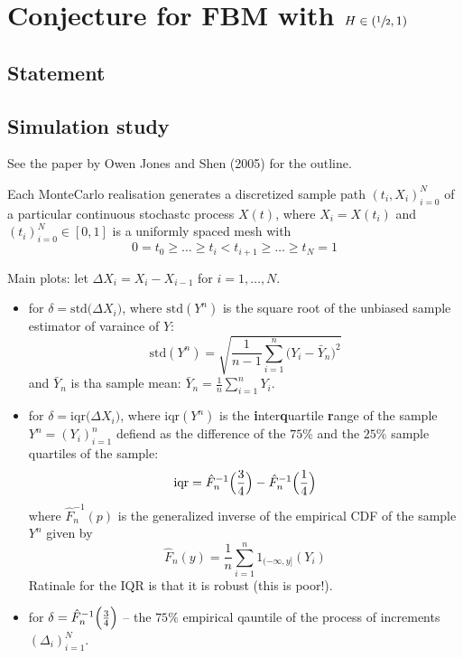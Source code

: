 \documentclass[a4paper]{report}
\begin{document}


\section{Conjecture for FBM with $H\in (\sfrac{1}{2},1)$} %
\label{sec:conjecture_for_fbm}

\subsection{Statement} %
\label{sub:statement}


\subsection{Simulation study} %
\label{sub:simulation_study_fbm}

See the paper by Owen Jones and Shen (2005) for the outline.

Each MonteCarlo realisation generates a discretized sample path $(t_i, X_i)_{i=0}^N$ of
a particular continuous stochastc process $X(t)$, where $X_i = X(t_i)$ and $(t_i)_{i=0}^N\in [0,1]$
is a uniformly spaced mesh with
\[0 = t_0 \geq \ldots \geq t_i < t_{i+1} \geq \ldots \geq t_N = 1\]

Main plots: let $\Delta X_i = X_i - X_{i-1}$ for $i=1,\ldots, N$.
\begin{itemize}
	\item for $\delta = \text{std}\bigl(\Delta X_i \bigr)$, where $\text{std}(Y^n)$ is
	the square root of the unbiased sample estimator of varaince of $Y$:
	\[ \text{std}(Y^n) = \sqrt{ \frac{1}{n-1} \sum_{i=1}^n \bigl( Y_i - \bar{Y}_n \bigr)^2 }\]
	and $\bar{Y}_n$ is tha sample mean: $\bar{Y}_n = \frac{1}{n}\sum_{i=1}^n Y_i$. 

	\item for $\delta = \text{iqr}\bigl(\Delta X_i \bigr)$, where $\text{iqr}(Y^n)$ is
	the \textbf{i}nter\textbf{q}uartile \textbf{r}ange of the sample $Y^n = (Y_i)_{i=1}^n$
	defiend as the difference of the $75\%$ and the $25\%$ sample quartiles of the sample:
	\[\text{iqr} = \hat{F}^{-1}_n\Bigl(\frac{3}{4}\Bigr) - \hat{F}^{-1}_n\Bigl(\frac{1}{4}\Bigr)\]
	where $\hat{F}^{-1}_n(p)$ is the generalized inverse of the empirical CDF of the sample $Y^n$
	given by
	\[\hat{F}_n(y) = \frac{1}{n} \sum_{i=1}^n 1_{(-\infty,y]}(Y_i)\]
	Ratinale for the IQR is that it is robust (this is poor!).
	\item for $\delta = \hat{F}^{-1}_n\Bigl(\frac{3}{4}\Bigr)$ -- the $75\%$ empirical qauntile of
	the process of increments $(\Delta_i)_{i=1}^N$.
\end{itemize}
\end{document}
